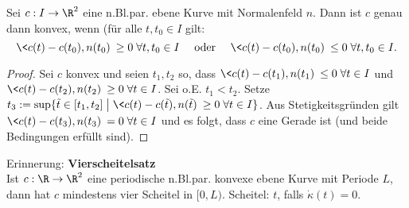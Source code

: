 \documentclass{mycourse}
\begin{document}
\begin{lem}
Sei $c: I  \to \R^2$ eine n.Bl.par. ebene Kurve mit Normalenfeld $n$. Dann ist $c$ genau dann konvex, wenn (für alle $t, t_0 \in I$ gilt:
\[ \< c(t) - c(t_0), n(t_0) \> \geq 0 \; \forall t, t_0 \in I \quad \text{ oder } \quad \< c(t) - c(t_0) , n(t_0) \> \leq 0 \; \forall t, t_0 \in I. \]
\begin{proof}
Sei $c$ konvex und seien $t_1, t_2$ so, dass $\< c(t) - c(t_1), n(t_1) \> \leq 0 \; \forall t \in I$ und $\< c(t) - c(t_2), n(t_2) \> \geq 0 \; \forall t \in I$. Sei o.E. $t_1 < t_2$. Setze $t_3 := \sup \{\tilde t \in [t_1, t_2] \; \big| \; \< c(t) - c(\tilde t), n(\tilde t) \> \geq 0 \; \forall t \in I \}$. Aus Stetigkeitsgründen gilt $\< c(t) - c(t_3), n(t_3) \> = 0 \; \forall t \in I$ und es folgt, dass $c$ eine Gerade ist (und beide Bedingungen erfüllt sind).
\end{proof}
\end{lem}



\newpage
\setcounter{thm}{7}
Erinnerung: \textbf{Vierscheitelsatz} \\
Ist $c: \R \to \R^2$ eine periodische n.Bl.par. konvexe ebene Kurve mit Periode $L$, dann hat $c$ mindestens vier Scheitel in $[0, L)$. Scheitel: $t$, falls $\dot \kappa(t) = 0$.
\end{document}
